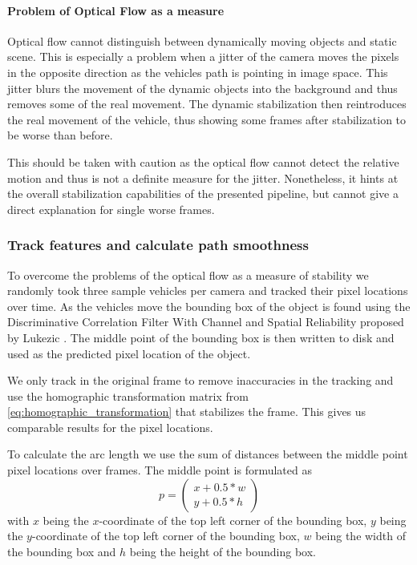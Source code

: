 \paragraph{Problem of Optical Flow as a measure}
\label{sec:dynamic_stabilization_evaluation_optical_flow_problem}
Optical flow cannot distinguish between dynamically moving objects and static scene.
This is especially a problem when a jitter of the camera moves the pixels in the opposite direction as the vehicles path is pointing in image space.
This jitter blurs the movement of the dynamic objects into the background and thus removes some of the real movement.
The dynamic stabilization then reintroduces the real movement of the vehicle, thus showing some frames after stabilization to be worse than before. 

This should be taken with caution as the optical flow cannot detect the relative motion and thus is not a definite measure for the jitter.
Nonetheless, it hints at the overall stabilization capabilities of the presented pipeline, but cannot give a direct explanation for single worse frames.



\subsubsection{Track features and calculate path smoothness}
To overcome the problems of the optical flow as a measure of stability we randomly took three sample vehicles per camera and tracked their pixel locations over time.
As the vehicles move the bounding box of the object is found using the Discriminative Correlation Filter With Channel and Spatial Reliability proposed by Lukezic \etal{} \cite{Lukezic_2017_CVPR,opencv_library}.
The middle point of the bounding box is then written to disk and used as the predicted pixel location of the object.

We only track in the original frame to remove inaccuracies in the tracking and use the homographic transformation matrix from \autoref{eq:homographic_transformation} that stabilizes the frame.
This gives us comparable results for the pixel locations. 

To calculate the arc length we use the sum of distances between the middle point pixel locations over frames. 
The middle point is formulated as 
\begin{equation}
    p = \begin{pmatrix}
        x + 0.5 * w \\
        y + 0.5 * h
    \end{pmatrix}
\end{equation}
with $x$ being the $x$-coordinate of the top left corner of the bounding box, 
$y$ being the $y$-coordinate of the top left corner of the bounding box, 
$w$ being the width of the bounding box and
$h$ being the height of the bounding box.

